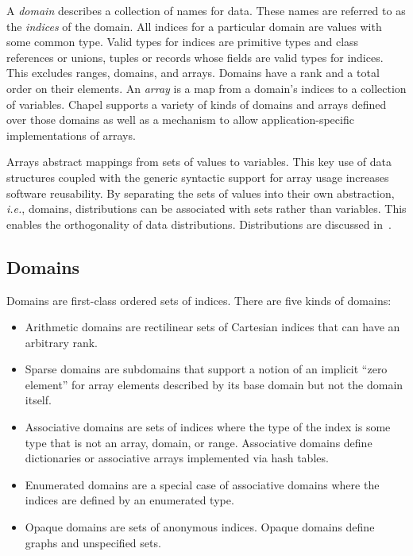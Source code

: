 \label{Domains_and_Arrays}

A \emph{domain} describes a collection of names for data.  These names
are referred to as the \emph{indices} of the domain.  All indices for
a particular domain are values with some common type.  Valid types for
indices are primitive types and class references or unions, tuples or
records whose fields are valid types for indices.  This excludes
ranges, domains, and arrays.  Domains have a rank and a total order on
their elements.  An \emph{array} is a map from a domain's indices to a
collection of variables.  Chapel supports a variety of kinds of
domains and arrays defined over those domains as well as a mechanism
to allow application-specific implementations of arrays.

Arrays abstract mappings from sets of values to variables.  This key
use of data structures coupled with the generic syntactic support for
array usage increases software reusability.  By separating the sets of
values into their own abstraction, \emph{i.e.}, domains, distributions
can be associated with sets rather than variables.  This enables the
orthogonality of data distributions.  Distributions are discussed
in~.

\subsection{Domains}
\label{Domains}

Domains are first-class ordered sets of indices.  There are five kinds
of domains:
\begin{itemize}
\item
Arithmetic domains are rectilinear sets of Cartesian indices that can
have an arbitrary rank.
\item
Sparse domains are subdomains that support a notion of an implicit
``zero element'' for array elements described by its base domain but
not the domain itself.
\item
Associative domains are sets of indices where the type of the index is
some type that is not an array, domain, or range.  Associative domains
define dictionaries or associative arrays implemented via hash tables.
\item
Enumerated domains are a special case of associative domains where the
indices are defined by an enumerated type.
\item
Opaque domains are sets of anonymous indices.  Opaque domains define
graphs and unspecified sets.
\end{itemize}

